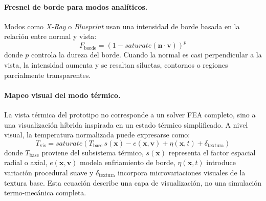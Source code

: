 \paragraph{Fresnel de borde para modos anal\'iticos.}
Modos como \textit{X-Ray} o \textit{Blueprint} usan una intensidad de borde basada en la relaci\'on entre normal y vista:
\[
F_{\text{borde}} = \left(1 - saturate(\mathbf{n}\cdot\mathbf{v})\right)^p
\]
donde $p$ controla la dureza del borde. Cuando la normal es casi perpendicular a la vista, la intensidad aumenta y se resaltan siluetas, contornos o regiones parcialmente transparentes.

\paragraph{Mapeo visual del modo t\'ermico.}
La vista t\'ermica del prototipo no corresponde a un solver FEA completo, sino a una visualizaci\'on h\'ibrida inspirada en un estado t\'ermico simplificado. A nivel visual, la temperatura normalizada puede expresarse como:
\[
T_{\text{vis}} = saturate\left(T_{\text{base}}\, s(\mathbf{x}) - e(\mathbf{x},\mathbf{v}) + \eta(\mathbf{x},t) + \delta_{\text{textura}}\right)
\]
donde $T_{\text{base}}$ proviene del subsistema t\'ermico, $s(\mathbf{x})$ representa el factor espacial radial o axial, $e(\mathbf{x},\mathbf{v})$ modela enfriamiento de borde, $\eta(\mathbf{x},t)$ introduce variaci\'on procedural suave y $\delta_{\text{textura}}$ incorpora microvariaciones visuales de la textura base. Esta ecuaci\'on describe una capa de visualizaci\'on, no una simulaci\'on termo-mec\'anica completa.

\newpage
